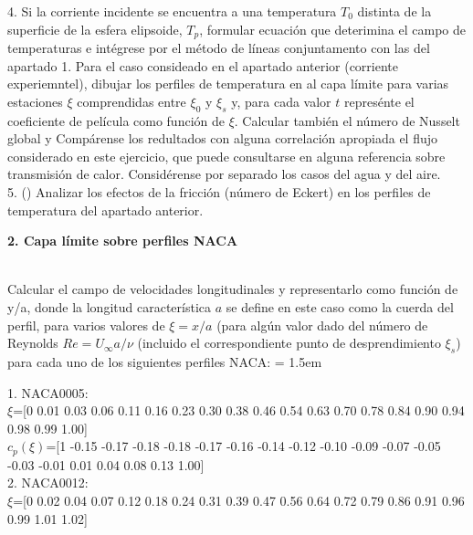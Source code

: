 \documentclass[11pt,a4paper]{article}
\begin{document}

4. Si la corriente incidente se encuentra a una temperatura $T_{0}$ distinta de la superficie de la esfera elipsoide, $T_{p}$, formular ecuación que deterimina el campo de temperaturas e intégrese por el método de líneas conjuntamento con las del apartado 1. Para el caso consideado en el apartado anterior (corriente experiemntel), dibujar los perfiles de temperatura en al capa límite para varias estaciones $\xi$ comprendidas entre $\xi_{0}$ y $\xi_{s}$ y, para cada valor $t$ represénte el coeficiente de película como función de $\xi$. Calcular también el número de Nusselt global y Compárense los redultados con alguna correlación apropiada el flujo considerado en este ejercicio, que puede consultarse en alguna referencia sobre transmisión de calor. Considérense por separado los casos del agua y del aire.
\\


5. () Analizar los efectos de la fricción (número de Eckert) en los perfiles de temperatura del apartado anterior.
\\
\begin{center}
{\Large  \textbf {2. Capa límite sobre perfiles NACA}}
\end{center}
\\

Calcular el campo de velocidades longitudinales y representarlo como función de y/a, donde la longitud característica $a$ se define en este caso como la cuerda del perfil, para varios valores de $\xi=x/a$ (para algún valor dado del número de Reynolds $Re=U_{\infty} a/\nu$ (incluido el correspondiente punto de desprendimiento $\xi_{s}$) para cada uno de los siguientes perfiles NACA:
\font= 1.5em

\vspace{1cm}
1. NACA0005:
\\

\hspace{1cm}
$\xi$=[0 0.01 0.03 0.06 0.11 0.16 0.23 0.30 0.38 0.46 0.54 0.63 0.70 0.78 0.84 0.90 0.94 0.98 0.99 1.00]
\\

$c_{p}(\xi)$=[1 -0.15 -0.17 -0.18 -0.18 -0.17 -0.16 -0.14 -0.12 -0.10 -0.09 -0.07 -0.05 -0.03 -0.01 0.01 0.04 0.08 0.13 1.00]
\\

2. NACA0012:
\\

\hspace{1cm}
$\xi$=[0 0.02 0.04 0.07 0.12 0.18 0.24 0.31 0.39 0.47 0.56 0.64 0.72 0.79 0.86 0.91 0.96 0.99 1.01 1.02]
\\
\end{document}
